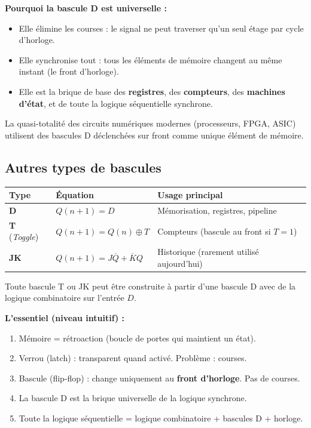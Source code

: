 \documentclass[12pt,a4paper,twoside]{book}
\begin{document}
\begin{intuition}
\textbf{Pourquoi la bascule D est universelle :}
\begin{itemize}[nosep]
\item Elle élimine les courses : le signal ne peut traverser qu'un seul étage par cycle d'horloge.
\item Elle synchronise tout : tous les éléments de mémoire changent au même instant (le front d'horloge).
\item Elle est la brique de base des \textbf{registres}, des \textbf{compteurs}, des \textbf{machines d'état}, et de toute la logique séquentielle synchrone.
\end{itemize}
La quasi-totalité des circuits numériques modernes (processeurs, FPGA, ASIC) utilisent des bascules D déclenchées sur front comme unique élément de mémoire.
\end{intuition}

\subsection{Autres types de bascules}

\begin{formule}
\begin{center}
\renewcommand{\arraystretch}{1.4}
\begin{tabular}{lp{5cm}p{5.5cm}}
\toprule
\textbf{Type} & \textbf{Équation} & \textbf{Usage principal} \\
\midrule
\textbf{D} & $Q(n+1) = D$ & Mémorisation, registres, pipeline \\
\textbf{T} (\textit{Toggle}) & $Q(n+1) = Q(n) \oplus T$ & Compteurs (bascule au front si $T = 1$) \\
\textbf{JK} & $Q(n+1) = J\overline{Q} + \overline{K}Q$ & Historique (rarement utilisé aujourd'hui) \\
\bottomrule
\end{tabular}
\end{center}
Toute bascule T ou JK peut être construite à partir d'une bascule D avec de la logique combinatoire sur l'entrée $D$.
\end{formule}

\begin{retenir}
\textbf{L'essentiel (niveau intuitif) :}
\begin{enumerate}[nosep]
\item Mémoire = rétroaction (boucle de portes qui maintient un état).
\item Verrou (latch) : transparent quand activé. Problème : courses.
\item Bascule (flip-flop) : change uniquement au \textbf{front d'horloge}. Pas de courses.
\item La bascule D est la brique universelle de la logique synchrone.
\item Toute la logique séquentielle = logique combinatoire + bascules D + horloge.
\end{enumerate}
\end{retenir}
\end{document}
